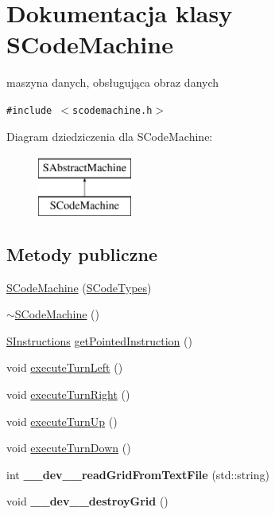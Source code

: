 \hypertarget{classSCodeMachine}{
\section{Dokumentacja klasy SCodeMachine}
\label{classSCodeMachine}
}
maszyna danych, obsługująca obraz danych  


{\tt \#include $<$scodemachine.h$>$}

Diagram dziedziczenia dla SCodeMachine:\begin{figure}[H]
\begin{center}
\leavevmode
\includegraphics[height=2cm]{classSCodeMachine}
\end{center}
\end{figure}
\subsection*{Metody publiczne}
\begin{CompactItemize}
\item 
\hyperlink{classSCodeMachine_bb85f472be7c8e2112bbe5d6643f99b7}{SCodeMachine} (\hyperlink{senums_8h_1a2ae45552936d27425f99e1c187b043}{SCodeTypes})
\item 
\hyperlink{classSCodeMachine_67d39a3662fc2640aa506a581766a9b8}{$\sim$SCodeMachine} ()
\item 
\hyperlink{senums_8h_b1c3fa9dccd3f8afa81e14a98d9a7d1e}{SInstructions} \hyperlink{classSCodeMachine_3c851e80ec35cbebeb78ec8ceed8c5ca}{getPointedInstruction} ()
\item 
void \hyperlink{classSCodeMachine_d8415a221140a08a9383a595336cdf69}{executeTurnLeft} ()
\item 
void \hyperlink{classSCodeMachine_d48065e7bf42eef9e3a0f81fbb17f301}{executeTurnRight} ()
\item 
void \hyperlink{classSCodeMachine_f2867d02414db096844e4801f9895650}{executeTurnUp} ()
\item 
void \hyperlink{classSCodeMachine_26b7ba8981d08d594b0c37617aa85277}{executeTurnDown} ()
\item 
\hypertarget{classSCodeMachine_c016cfcdf0700d5a0829d497a79eb259}{
int \textbf{\_\-\_\-dev\_\-\_\-readGridFromTextFile} (std::string)}
\label{classSCodeMachine_c016cfcdf0700d5a0829d497a79eb259}

\item 
\hypertarget{classSCodeMachine_c9345e02c8383585cf1738c653f83cfd}{
void \textbf{\_\-\_\-dev\_\-\_\-destroyGrid} ()}
\label{classSCodeMachine_c9345e02c8383585cf1738c653f83cfd}

\end{CompactItemize}


